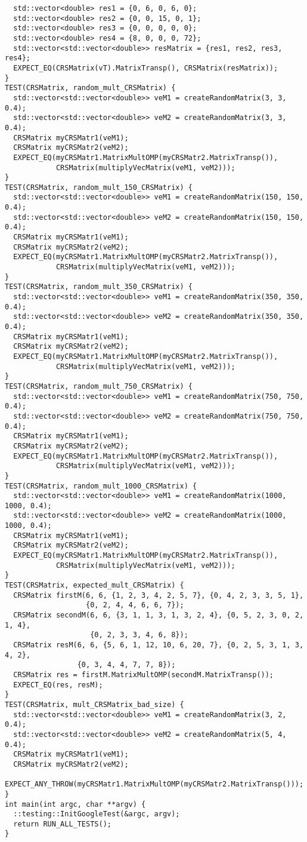 \documentclass[14pt, russian]{extarticle}
\begin{document}
\begin{lstlisting}
  std::vector<double> res1 = {0, 6, 0, 6, 0};
  std::vector<double> res2 = {0, 0, 15, 0, 1};
  std::vector<double> res3 = {0, 0, 0, 0, 0};
  std::vector<double> res4 = {8, 0, 0, 0, 72};
  std::vector<std::vector<double>> resMatrix = {res1, res2, res3, res4};
  EXPECT_EQ(CRSMatrix(vT).MatrixTransp(), CRSMatrix(resMatrix));
}
TEST(CRSMatrix, random_mult_CRSMatrix) {
  std::vector<std::vector<double>> veM1 = createRandomMatrix(3, 3, 0.4);
  std::vector<std::vector<double>> veM2 = createRandomMatrix(3, 3, 0.4);
  CRSMatrix myCRSMatr1(veM1);
  CRSMatrix myCRSMatr2(veM2);
  EXPECT_EQ(myCRSMatr1.MatrixMultOMP(myCRSMatr2.MatrixTransp()),
            CRSMatrix(multiplyVecMatrix(veM1, veM2)));
}
TEST(CRSMatrix, random_mult_150_CRSMatrix) {
  std::vector<std::vector<double>> veM1 = createRandomMatrix(150, 150, 0.4);
  std::vector<std::vector<double>> veM2 = createRandomMatrix(150, 150, 0.4);
  CRSMatrix myCRSMatr1(veM1);
  CRSMatrix myCRSMatr2(veM2);
  EXPECT_EQ(myCRSMatr1.MatrixMultOMP(myCRSMatr2.MatrixTransp()),
            CRSMatrix(multiplyVecMatrix(veM1, veM2)));
}
TEST(CRSMatrix, random_mult_350_CRSMatrix) {
  std::vector<std::vector<double>> veM1 = createRandomMatrix(350, 350, 0.4);
  std::vector<std::vector<double>> veM2 = createRandomMatrix(350, 350, 0.4);
  CRSMatrix myCRSMatr1(veM1);
  CRSMatrix myCRSMatr2(veM2);
  EXPECT_EQ(myCRSMatr1.MatrixMultOMP(myCRSMatr2.MatrixTransp()),
            CRSMatrix(multiplyVecMatrix(veM1, veM2)));
}
TEST(CRSMatrix, random_mult_750_CRSMatrix) {
  std::vector<std::vector<double>> veM1 = createRandomMatrix(750, 750, 0.4);
  std::vector<std::vector<double>> veM2 = createRandomMatrix(750, 750, 0.4);
  CRSMatrix myCRSMatr1(veM1);
  CRSMatrix myCRSMatr2(veM2);
  EXPECT_EQ(myCRSMatr1.MatrixMultOMP(myCRSMatr2.MatrixTransp()),
            CRSMatrix(multiplyVecMatrix(veM1, veM2)));
}
TEST(CRSMatrix, random_mult_1000_CRSMatrix) {
  std::vector<std::vector<double>> veM1 = createRandomMatrix(1000, 1000, 0.4);
  std::vector<std::vector<double>> veM2 = createRandomMatrix(1000, 1000, 0.4);
  CRSMatrix myCRSMatr1(veM1);
  CRSMatrix myCRSMatr2(veM2);
  EXPECT_EQ(myCRSMatr1.MatrixMultOMP(myCRSMatr2.MatrixTransp()),
            CRSMatrix(multiplyVecMatrix(veM1, veM2)));
}
TEST(CRSMatrix, expected_mult_CRSMatrix) {
  CRSMatrix firstM(6, 6, {1, 2, 3, 4, 2, 5, 7}, {0, 4, 2, 3, 3, 5, 1},
                   {0, 2, 4, 4, 6, 6, 7});
  CRSMatrix secondM(6, 6, {3, 1, 1, 3, 1, 3, 2, 4}, {0, 5, 2, 3, 0, 2, 1, 4},
                    {0, 2, 3, 3, 4, 6, 8});
  CRSMatrix resM(6, 6, {5, 6, 1, 12, 10, 6, 20, 7}, {0, 2, 5, 3, 1, 3, 4, 2},
                 {0, 3, 4, 4, 7, 7, 8});
  CRSMatrix res = firstM.MatrixMultOMP(secondM.MatrixTransp());
  EXPECT_EQ(res, resM);
}
TEST(CRSMatrix, mult_CRSMatrix_bad_size) {
  std::vector<std::vector<double>> veM1 = createRandomMatrix(3, 2, 0.4);
  std::vector<std::vector<double>> veM2 = createRandomMatrix(5, 4, 0.4);
  CRSMatrix myCRSMatr1(veM1);
  CRSMatrix myCRSMatr2(veM2);
  EXPECT_ANY_THROW(myCRSMatr1.MatrixMultOMP(myCRSMatr2.MatrixTransp()));
}
int main(int argc, char **argv) {
  ::testing::InitGoogleTest(&argc, argv);
  return RUN_ALL_TESTS();
}


	\end{lstlisting}
	\newpage
\end{document}
